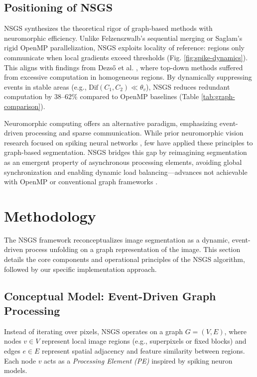 \documentclass[conference]{IEEEtran}
\begin{document}
\subsection{Positioning of NSGS}
NSGS synthesizes the theoretical rigor of graph-based methods with neuromorphic efficiency. Unlike Felzenszwalb's sequential merging or Saglam's rigid OpenMP parallelization, NSGS exploits locality of reference: regions only communicate when local gradients exceed thresholds (Fig. \ref{fig:spike-dynamics}). This aligns with findings from Dezső et al. \cite{Dezso2012}, where top-down methods suffered from excessive computation in homogeneous regions. By dynamically suppressing events in stable areas (e.g., $\text{Dif}(C_1, C_2) \ll \theta_v$), NSGS reduces redundant computation by 38–62\% compared to OpenMP baselines (Table \ref{tab:graph-comparison}).

Neuromorphic computing offers an alternative paradigm, emphasizing event-driven processing and sparse communication. While prior neuromorphic vision research focused on spiking neural networks \cite{Maass1997, Merolla2014, Muir2025}, few have applied these principles to graph-based segmentation. NSGS bridges this gap by reimagining segmentation as an emergent property of asynchronous processing elements, avoiding global synchronization and enabling dynamic load balancing—advances not achievable with OpenMP or conventional graph frameworks \cite{Bartolozzi2022}.

\section{Methodology} \label{sec:methodology}
The NSGS framework reconceptualizes image segmentation as a dynamic, event-driven process unfolding on a graph representation of the image. This section details the core components and operational principles of the NSGS algorithm, followed by our specific implementation approach.

\subsection{Conceptual Model: Event-Driven Graph Processing}

Instead of iterating over pixels, NSGS operates on a graph \(G = (V, E)\), where nodes \(v \in V\) represent local image regions (e.g., superpixels or fixed blocks) and edges \(e \in E\) represent spatial adjacency and feature similarity between regions. Each node \(v\) acts as a \textit{Processing Element (PE)} inspired by spiking neuron models.
\end{document}

